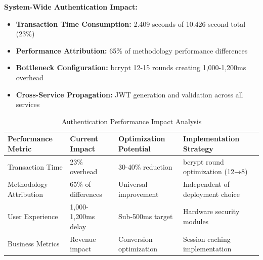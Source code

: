 \textbf{System-Wide Authentication Impact:}
\begin{itemize}
\item \textbf{Transaction Time Consumption:} 2.409 seconds of 10.426-second total (23\%)
\item \textbf{Performance Attribution:} 65\% of methodology performance differences
\item \textbf{Bottleneck Configuration:} bcrypt 12-15 rounds creating 1,000-1,200ms overhead
\item \textbf{Cross-Service Propagation:} JWT generation and validation across all services
\end{itemize}

\begin{table}[H]
\centering
\caption{Authentication Performance Impact Analysis}
\label{tab:authentication_impact}
\begin{tabular}{|p{3.5cm}|p{2.5cm}|p{3cm}|p{4.5cm}|}
\hline
\textbf{Performance Metric} & \textbf{Current Impact} & \textbf{Optimization Potential} & \textbf{Implementation Strategy} \\
\hline
Transaction Time & 23\% overhead & 30-40\% reduction & bcrypt round optimization (12→8) \\
\hline
Methodology Attribution & 65\% of differences & Universal improvement & Independent of deployment choice \\
\hline
User Experience & 1,000-1,200ms delay & Sub-500ms target & Hardware security modules \\
\hline
Business Metrics & Revenue impact & Conversion optimization & Session caching implementation \\
\hline
\end{tabular}
\end{table}

